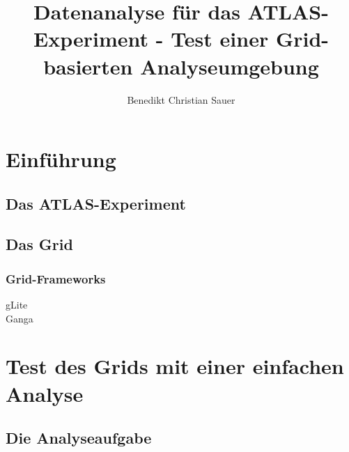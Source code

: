 \documentclass{scrartcl}
\author{Benedikt Christian Sauer}
\title{Datenanalyse für das ATLAS-Experiment - Test einer Grid-basierten
Analyseumgebung}
\begin{document}
\section{Einführung}
\subsection{Das ATLAS-Experiment}
\subsection{Das Grid}
\subsubsection{Grid-Frameworks}
\begin{description}
    \item[gLite]
    \item[Ganga]
\end{description}

\section{Test des Grids mit einer einfachen Analyse}
\subsection{Die Analyseaufgabe}

\begin{figure}[H]
  \begin{tikzpicture}

  \end{tikzpicture}
  \caption{}
  \label{fig:fn_graph}
\end{figure}
\end{document}

